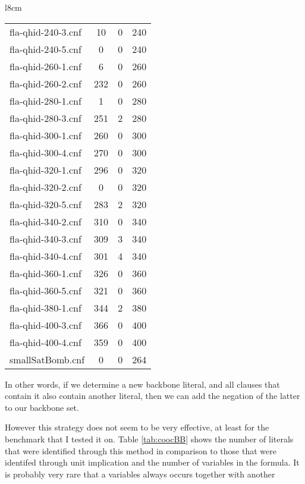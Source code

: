 \begin{wraptable}{l}{8cm}
\begin{tabular}{l| c c c }
fla-qhid-240-3.cnf & 10 & 0 & 240 \\
fla-qhid-240-5.cnf & 0 & 0 & 240 \\
fla-qhid-260-1.cnf & 6 & 0 & 260 \\
fla-qhid-260-2.cnf & 232 & 0 & 260 \\
fla-qhid-280-1.cnf & 1 & 0 & 280 \\
fla-qhid-280-3.cnf & 251 & 2 & 280 \\
\fi
fla-qhid-300-1.cnf & 260 & 0 & 300 \\
fla-qhid-300-4.cnf & 270 & 0 & 300 \\
fla-qhid-320-1.cnf & 296 & 0 & 320 \\
fla-qhid-320-2.cnf & 0 & 0 & 320 \\
fla-qhid-320-5.cnf & 283 & 2 & 320 \\
fla-qhid-340-2.cnf & 310 & 0 & 340 \\
fla-qhid-340-3.cnf & 309 & 3 & 340 \\
fla-qhid-340-4.cnf & 301 & 4 & 340 \\
fla-qhid-360-1.cnf & 326 & 0 & 360 \\
fla-qhid-360-5.cnf & 321 & 0 & 360 \\
fla-qhid-380-1.cnf & 344 & 2 & 380 \\
fla-qhid-400-3.cnf & 366 & 0 & 400 \\
fla-qhid-400-4.cnf & 359 & 0 & 400 \\
smallSatBomb.cnf & 0 & 0 & 264 \\
\end{tabular}
\caption{Comparison of number of backbone literals identified through cooccurrence in comparison to the number identified through unit implication.}
\label{tab:coocBB}
\end{wraptable}

In other words, if we determine a new backbone literal, and all clauses that contain it also contain another literal, then we can add the negation of the latter to our backbone set. 

However this strategy does not seem to be very effective, at least for the benchmark that I tested it on. Table \ref{tab:coocBB} shows the number of literals that were identified through this method in comparison to those that were identifed through unit implication and the number of variables in the formula. It is probably very rare that a variables always occurs together with another




